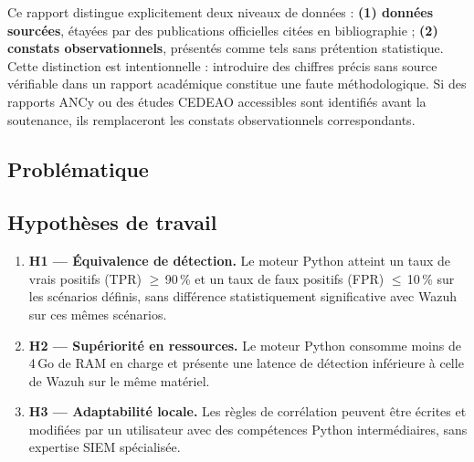 \documentclass[11pt,a4paper]{article}
\begin{document}
\begin{infobox}[title={Positionnement méthodologique sur les données contextuelles}]
Ce rapport distingue explicitement deux niveaux de données :
\textbf{(1) données sourcées}, étayées par des publications officielles
citées en bibliographie ;
\textbf{(2) constats observationnels}, présentés comme tels
sans prétention statistique.
Cette distinction est intentionnelle : introduire des chiffres précis
sans source vérifiable dans un rapport académique constitue une faute
méthodologique. Si des rapports ANCy ou des études CEDEAO accessibles
sont identifiés avant la soutenance, ils remplaceront les constats
observationnels correspondants.
\end{infobox}

\subsection{Problématique}

\begin{center}
\end{center}

\subsection{Hypothèses de travail}

\begin{enumerate}
  \item \textbf{H1 — Équivalence de détection.} Le moteur Python atteint un taux de
        vrais positifs (TPR) $\geq$\,90\,\% et un taux de faux positifs (FPR)
        $\leq$\,10\,\% sur les scénarios définis, sans différence statistiquement
        significative avec Wazuh sur ces mêmes scénarios.
  \item \textbf{H2 — Supériorité en ressources.} Le moteur Python consomme moins de
        4\,Go de RAM en charge et présente une latence de détection inférieure
        à celle de Wazuh sur le même matériel.
  \item \textbf{H3 — Adaptabilité locale.} Les règles de corrélation peuvent être
        écrites et modifiées par un utilisateur avec des compétences Python
        intermédiaires, sans expertise SIEM spécialisée.
\end{enumerate}
\end{document}
